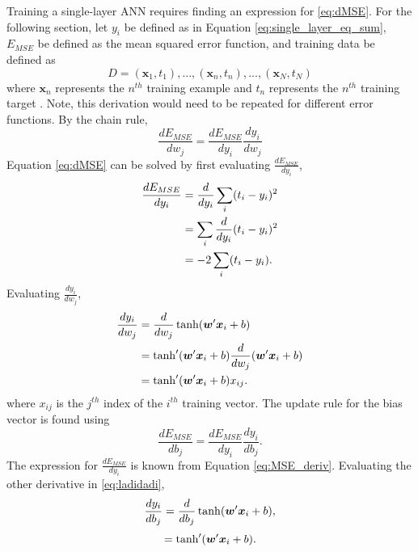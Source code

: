 Training a single-layer ANN requires finding an expression for \ref{eq:dMSE}. For the following section, let $y_i$ be defined as in Equation \ref{eq:single_layer_eq_sum}, $E_{MSE}$ be defined as the mean squared error function, and training data be defined as 
%
\begin{equation} \label{eq:train_data_D}
 D={(\boldsymbol{x}_1,t_1), ... , (\boldsymbol{x}_n,t_n), ... , (\boldsymbol{x}_N,t_N)}
\end{equation}
%
where $\boldsymbol{x}_{n}$ represents the $n^{th}$ training example and $t_n$ represents the $n^{th}$ training target \cite{Nielsen2015}. Note, this derivation would need to be repeated for different error functions. By the chain rule,
%
\begin{equation} \label{eq:dMSE}
\frac{dE_{MSE}}{dw_j} = \frac{dE_{MSE}}{dy_i} \frac{dy_i}{dw_j}
\end{equation}
%
Equation \ref{eq:dMSE} can be solved by first evaluating $\frac{dE_{MSE}}{dy_i}$,
%
\begin{align*} \label{dE_{MSE}/dy_i}
\frac{dE_{MSE}}{dy_i}  &= \frac{d}{dy_i} \sum_i(t_i - y_i)^2 \\
&= \sum_i  \frac{d}{dy_i} (t_i - y_i)^2 \\
&=  -2 \sum_i  (t_i - y_i).
\end{align*}
%
Evaluating $\frac{dy_i}{dw_j}$,
%
\begin{align*} \label{dE_{MSE}/dy_i}
\frac{dy_i}{dw_j}  &= \frac{d}{dw_j} \tanh( \boldsymbol{w}' \boldsymbol{x}_i + b) \\
&= \tanh'( \boldsymbol{w}' \boldsymbol{x}_i + b) \frac{d}{dw_j}( \boldsymbol{w}' \boldsymbol{x}_i + b) \\
&= \tanh'( \boldsymbol{w}' \boldsymbol{x}_i + b)  x_{ij}.
\end{align*} 
%
\noindent where $x_{ij}$ is the $j^{th}$ index of the $i^{th}$ training vector.
%
The update rule for the bias vector is found using
%
\begin{equation} \label{eq:ladidadi}
\frac{dE_{MSE}}{db_j} = \frac{dE_{MSE}}{dy_i} \frac{dy_i}{db_j}.
\end{equation}
%
The expression for $\frac{dE_{MSE}}{dy_i}$ is known from Equation \ref{eq:MSE_deriv}. Evaluating the other derivative in \ref{eq:ladidadi},
%
\begin{equation} \label{dE_{MSE}/dw_j}
\frac{dy_i}{db_j} = \frac{d}{db_j} \tanh(\boldsymbol{w}'\boldsymbol{x}_i + b),
\end{equation}
%
\begin{equation} \label{dE_{MSE}/dy_i}
 = \tanh'( \boldsymbol{w}' \boldsymbol{x}_i + b).
\end{equation}
